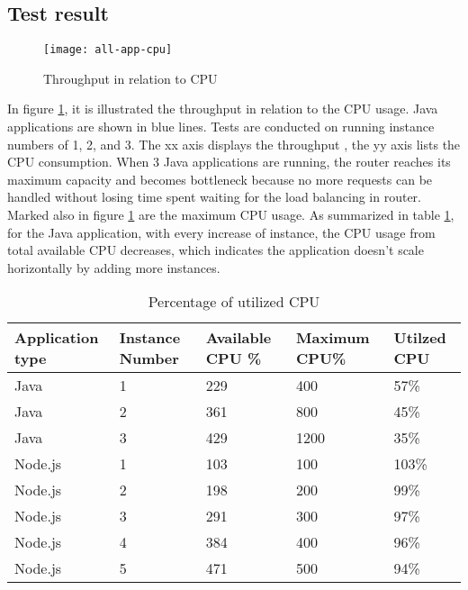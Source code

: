 \subsection{Test result}
 \begin{figure}[h]
	\centering
	\texttt{[image: all-app-cpu]}
	\caption{Throughput in relation to CPU}
	\label{all-app-cpu}
\end{figure}
In figure \ref{all-app-cpu}, it is illustrated the throughput in relation to the CPU usage. Java applications are shown in blue lines. Tests are conducted on running instance numbers of 1, 2, and 3. The xx axis displays the throughput , the yy axis lists the CPU consumption. When 3 Java applications are running, the router reaches its maximum capacity and becomes bottleneck because no more requests can be handled without losing time spent waiting for the load balancing in router. Marked also in figure \ref{all-app-cpu} are the maximum CPU usage. As summarized in table \ref{app-cpu-usage}, for the Java application, with every increase of instance, the CPU usage from total available CPU decreases, which indicates the application doesn't scale horizontally by adding more instances. 
\begin{table}[h]
	\caption{Percentage of utilized CPU}
	\label{app-cpu-usage}
	\renewcommand{\arraystretch}{1.2}
	\centering
	\sffamily
	\begin{footnotesize}
		\begin{tabular}{l l l l l  }
			\toprule
			\textbf{Application  type} &\textbf{Instance Number} & \textbf{Available CPU \%} & \textbf{Maximum CPU\%}& \textbf{Utilzed CPU} }\\
		\midrule
		Java &1 	&	229	 & 400 & 57\% \\
		Java &2	&	361 & 800& 45\% \\
		Java &3	&	429  &	1200 & 35\%\\
				\midrule
			Node.js &1 	&	103	 & 100 & 103\% \\
		Node.js &2	&	198 &  200& 99\% \\
		Node.js &3	&	291 & 300 & 97\%\\
		Node.js &4	&	384 & 400 & 96\%\\
		Node.js &5	&	471 & 500 & 94\%\\
		\bottomrule
	\end{tabular}
\end{footnotesize}
\rmfamily
\end{table}

